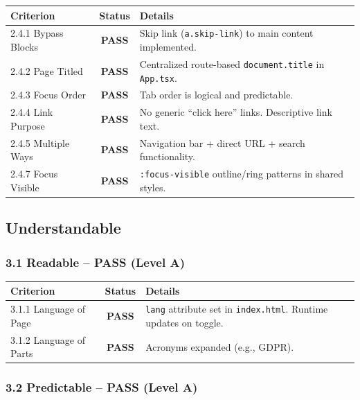\documentclass[12pt,a4paper]{article}
\newcommand{\pass}{\textcolor{passgreen}{\textbf{PASS}}}
\begin{document}
\begin{table}[H]
\centering
\begin{tabularx}{\textwidth}{lcX}
\toprule
\textbf{Criterion} & \textbf{Status} & \textbf{Details} \\
\midrule
2.4.1 Bypass Blocks   & \pass & Skip link (\texttt{a.skip-link}) to main content implemented. \\
2.4.2 Page Titled     & \pass & Centralized route-based \texttt{document.title} in \texttt{App.tsx}. \\
2.4.3 Focus Order     & \pass & Tab order is logical and predictable. \\
2.4.4 Link Purpose    & \pass & No generic ``click here'' links. Descriptive link text. \\
2.4.5 Multiple Ways   & \pass & Navigation bar + direct URL + search functionality. \\
2.4.7 Focus Visible   & \pass & \texttt{:focus-visible} outline/ring patterns in shared styles. \\
\bottomrule
\end{tabularx}
\end{table}

\subsection{Understandable}

\subsubsection{3.1 Readable -- \pass{} (Level A)}

\begin{table}[H]
\centering
\begin{tabularx}{\textwidth}{lcX}
\toprule
\textbf{Criterion} & \textbf{Status} & \textbf{Details} \\
\midrule
3.1.1 Language of Page  & \pass & \texttt{lang} attribute set in \texttt{index.html}. Runtime updates on toggle. \\
3.1.2 Language of Parts & \pass & Acronyms expanded (e.g., GDPR). \\
\bottomrule
\end{tabularx}
\end{table}

\subsubsection{3.2 Predictable -- \pass{} (Level A)}
\end{document}
